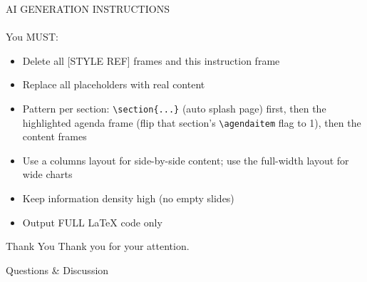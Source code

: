 \documentclass[aspectratio=169,10pt,xcolor=table]{beamer}
\begin{document}
\begin{frame}{AI GENERATION INSTRUCTIONS}
\framesubtitle{}
You MUST:
\begin{itemize}
\item Delete all [STYLE REF] frames and this instruction frame
\item Replace all placeholders with real content
\item Pattern per section: \texttt{\textbackslash section\{...\}} (auto splash page)
      first, then the highlighted agenda frame (flip that section's
      \texttt{\textbackslash agendaitem} flag to 1), then the content frames
\item Use a columns layout for side-by-side content; use the full-width
      layout for wide charts
\item Keep information density high (no empty slides)
\item Output FULL LaTeX code only
\end{itemize}
\end{frame}

\begin{frame}{Thank You}
\centering
\vspace{1.5em}
{\Large Thank you for your attention.}

\vspace{1.2em}
{\large Questions \& Discussion}

\vspace{1.5em}
\end{frame}
\end{document}
